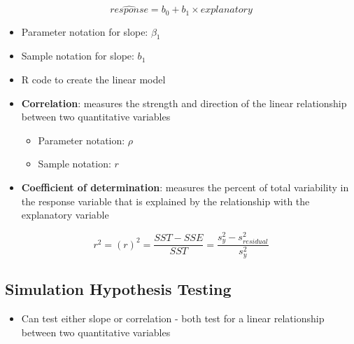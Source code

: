 \documentclass[
]{report}
\newenvironment{Shaded}{\begin{snugshade}}{\end{snugshade}}
\newcommand{\AttributeTok}[1]{\textcolor[rgb]{0.13,0.29,0.53}{#1}}
\newcommand{\CommentTok}[1]{\textcolor[rgb]{0.56,0.35,0.01}{\textit{#1}}}
\newcommand{\DecValTok}[1]{\textcolor[rgb]{0.00,0.00,0.81}{#1}}
\newcommand{\FunctionTok}[1]{\textcolor[rgb]{0.13,0.29,0.53}{\textbf{#1}}}
\newcommand{\NormalTok}[1]{#1}
\newcommand{\OtherTok}[1]{\textcolor[rgb]{0.56,0.35,0.01}{#1}}
\newcommand{\SpecialCharTok}[1]{\textcolor[rgb]{0.81,0.36,0.00}{\textbf{#1}}}
\providecommand{\tightlist}{%
  \setlength{\itemsep}{0pt}\setlength{\parskip}{0pt}}
\begin{document}
\[\widehat{response} = b_0 + b_1 \times explanatory\]
\vspace{1mm}

\begin{itemize}
\item
  Parameter notation for slope: \(\beta_1\)
\item
  Sample notation for slope: \(b_1\)
\item
  R code to create the linear model
\end{itemize}

\begin{Shaded}
\end{Shaded}

\begin{itemize}
\item
  \textbf{Correlation}: measures the strength and direction of the linear relationship between two quantitative variables

  \begin{itemize}
  \item
    Parameter notation: \(\rho\)
  \item
    Sample notation: \(r\)
  \end{itemize}
\item
  \textbf{Coefficient of determination}: measures the percent of total variability in the response variable that is explained by the relationship with the explanatory variable
\end{itemize}

\[r^2 = (r)^2 = \frac{SST - SSE}{SST} = \frac{s^2_y - s^2_{residual}}{s^2_y}\]

\subsection*{Simulation Hypothesis Testing}\label{simulation-hypothesis-testing-2}

\begin{itemize}
\tightlist
\item
  Can test either slope or correlation - both test for a linear relationship between two quantitative variables
\end{itemize}
\end{document}
